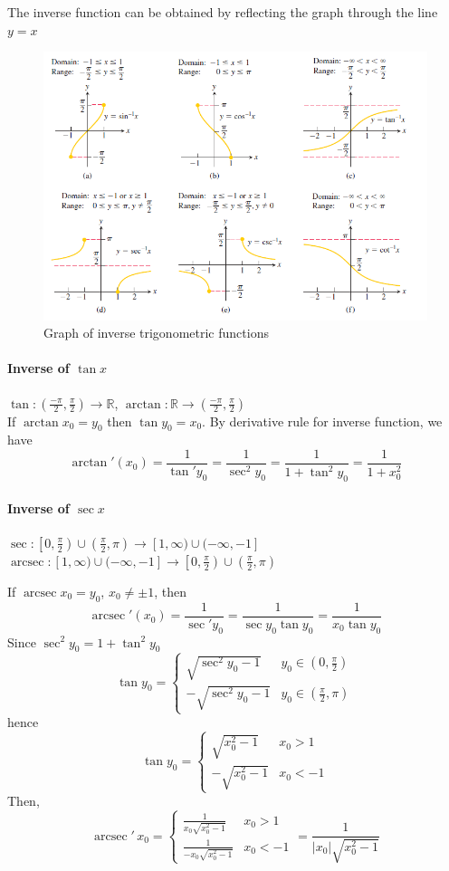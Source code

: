 \documentclass[12pt]{article}
\DeclareMathOperator{\arcsec}{arcsec}
\begin{document}
The inverse function can be obtained by reflecting the graph through the line $y = x$
\begin{figure}[H] 
    \centering
    \includegraphics[width = 0.6\linewidth]{Images/inverse trigonometric function.png}
    \caption{Graph of inverse trigonometric functions}
\end{figure}

\paragraph{Inverse of $\tan x$} $\tan : \left( \frac{-\pi}{2}, \frac{\pi}{2} \right) \to \mathbb{R}$, $\arctan : \mathbb{R} \to \left( \frac{-\pi}{2}, \frac{\pi}{2} \right)$ \\ 
If $\arctan x_0 = y_0$ then $\tan y_0 = x_0$. By derivative rule for inverse function, we have
\[
    \arctan '(x_0) = \frac{1}{\tan'y_0} = \frac{1}{\sec^2 y_0} = \frac{1}{1 + \tan^2 y_0} = \frac{1}{1 + x_0^2}
\]

\paragraph{Inverse of $\sec x$} $\sec : \left[ 0,\frac{\pi}{2}\right) \cup \left(\frac{\pi}{2}, \pi \right) \to [1, \infty) \cup (-\infty, -1]$ 
$\arcsec : [1, \infty) \cup (-\infty, -1] \to \left[ 0,\frac{\pi}{2}\right) \cup \left(\frac{\pi}{2}, \pi \right)$

If $\arcsec x_0 = y_0$, $x_0 \neq \pm 1$, then 
\[
    \arcsec '(x_0) = \frac{1}{\sec 'y_0} = \frac{1}{\sec y_0 \tan y_0} = \frac{1}{x_0 \tan y_0} 
\]
Since $\sec^2 y_0 = 1 + \tan^2 y_0$
\[
    \tan y_0 = 
    \begin{cases} 
        \sqrt{\sec^2 y_0 - 1} & y_0 \in \left( 0, \frac{\pi}{2} \right) \\
        - \sqrt{\sec^2 y_0 - 1} & y_0 \in \left(\frac{\pi}{2}, \pi \right)
    \end{cases} 
\]
hence
\[
    \tan y_0 = 
    \begin{cases} 
        \sqrt{x_0^2 - 1} & x_0 > 1\\
        - \sqrt{x_0^2 - 1} & x_0 < - 1
    \end{cases} 
\]
Then,
\[
    \arcsec '\, x_0 = 
    \begin{cases} 
        \frac{1}{x_0 \sqrt{x_0^2 - 1}} & x_0 > 1\\
        \frac{1}{ - x_0 \sqrt{x_0^2 - 1}} & x_0 < - 1
    \end{cases} = \frac{1}{|x_0| \sqrt{x_0^2 - 1}}
\]
\end{document}
